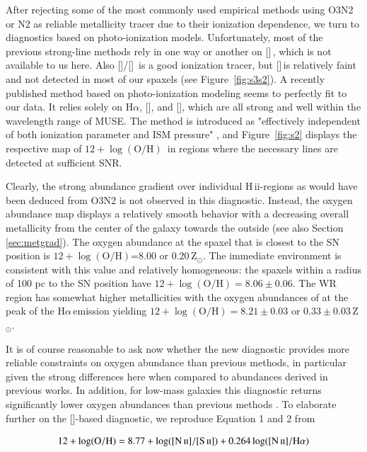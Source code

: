 \documentclass[traditabstract]{aa}
\newcommand{\ha}{H$\alpha$}
\newcommand{\hii}{\mbox{H\,{\sc ii}}}
\newcommand{\oh}{$12+\log(\mathrm{O/H})$}
\newcommand{\sii}{[\ion{S}{ii}]}
\newcommand{\siii}{[\ion{S}{iii}]}
\newcommand{\oii}{[\ion{O}{ii}]}
\newcommand{\nii}{[\ion{N}{ii}]}
\begin{document}
After rejecting some of the most commonly used empirical methods using O3N2 or N2 as reliable metallicity tracer due to their ionization dependence, we turn to diagnostics based on photo-ionization models. Unfortunately, most of the previous strong-line methods rely in one way or another on \oii\,\citep{2002ApJS..142...35K}, which is not available to us here. Also \siii/\sii\, is a good ionization tracer, but \siii\,is relatively faint and not detected in most of our spaxels (see Figure~\ref{fig:s3s2}). A recently published method based on photo-ionization modeling \citep{2016Ap&SS.361...61D} seems to perfectly fit to our data. It relies solely on \ha, \nii, and \sii, which are all strong and well within the wavelength range of MUSE. The method is introduced as "effectively independent of both ionization parameter and ISM pressure" \citep{2016Ap&SS.361...61D}, and Figure~\ref{fig:s2} displays the respective map of \oh\, in regions where the necessary lines are detected at sufficient SNR.

Clearly, the strong abundance gradient over individual \hii-regions as would have been deduced from O3N2 is not observed in this diagnostic. Instead, the oxygen abundance map displays a relatively smooth behavior with a decreasing overall metallicity from the center of the galaxy towards the outside (see also Section \ref{sec:metgrad}). The oxygen abundance at the spaxel that is closest to the SN position is \oh=8.00 or 0.20\,Z$_{\odot}$. The immediate environment is consistent with this value and relatively homogeneous: the spaxels within a radius of 100 pc to the SN position have \oh$=8.06\pm 0.06$. The WR region has somewhat higher metallicities with the oxygen abundances of at the peak of the \ha\,emission yielding \oh$=8.21\pm 0.03$ or $0.33\pm0.03\,$Z$_{\odot}$.

It is of course reasonable to ask now whether the new \citet{2016Ap&SS.361...61D} diagnostic provides more reliable constraints on oxygen abundance than previous methods, in particular given the strong differences here when compared to abundances derived in previous works. In addition, for low-mass galaxies this diagnostic returns significantly lower oxygen abundances than previous methods \citep{2016ApJ...823L..24K}. To elaborate further on the \sii-based diagnostic, we reproduce Equation 1 and 2 from \citet{2016Ap&SS.361...61D}

\begin{equation}
12+\log(\mathrm{O/H}) = 8.77 + \log([\ion{N}{ii}]/[\ion{S}{ii}]) + 0.264\log([\ion{N}{ii}]/\mathrm{H}\alpha)
\end{equation}
\end{document}
